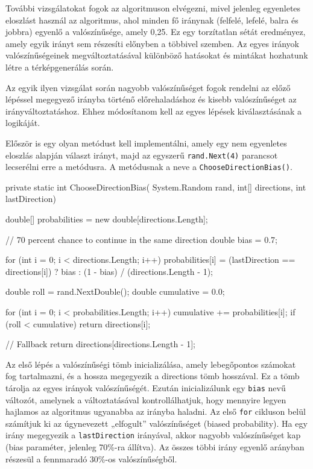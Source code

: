 \newpage
További vizsgálatokat fogok az algoritmuson elvégezni, mivel jelenleg egyenletes eloszlást használ az algoritmus, ahol minden fő iránynak (felfelé, lefelé, balra és jobbra) egyenlő a valószínűsége, amely 0,25. Ez egy torzítatlan sétát eredményez, amely egyik irányt sem részesíti előnyben a többivel szemben. Az egyes irányok valószínűségeinek megváltoztatásával különböző hatásokat és mintákat hozhatunk létre a térképgenerálás során.

Az egyik ilyen vizsgálat során nagyobb valószínűséget fogok rendelni az előző lépéssel megegyező irányba történő előrehaladáshoz és kisebb valószínűséget az irányváltoztatáshoz. Ehhez módosítanom kell az egyes lépések kiválasztásának a logikáját.

Először is egy olyan metódust kell implementálni, amely egy nem egyenletes eloszlás alapján választ irányt, majd az egyszerű \texttt{rand.Next(4)} parancsot lecserélni erre a metódusra. A metódusnak a neve a \texttt{ChooseDirectionBias()}.

\begin{java}
private static int ChooseDirectionBias(
    System.Random rand, int[] directions, int lastDirection)
{
    double[] probabilities = 
        new double[directions.Length];

    // 70 percent chance to continue in the same direction
    double bias = 0.7; 

    for (int i = 0; i < directions.Length; i++)
    {
        probabilities[i] = 
            (lastDirection == directions[i]) ? 
            bias : (1 - bias) / (directions.Length - 1);
    }

    double roll = rand.NextDouble();
    double cumulative = 0.0;

    for (int i = 0; i < probabilities.Length; i++)
    {
        cumulative += probabilities[i];
        if (roll < cumulative)
        {
            return directions[i];
        }
    }

    // Fallback
    return directions[directions.Length - 1]; 
}
\end{java}

Az első lépés a valószínűségi tömb inicializálása, amely lebegőpontos számokat fog tartalmazni, és a hossza megegyezik a directions tömb hosszával. Ez a tömb tárolja az egyes irányok valószínűségét. Ezután inicializálunk egy \texttt{bias} nevű változót, amelynek a változtatásával kontrollálhatjuk, hogy mennyire legyen hajlamos az algoritmus ugyanabba az irányba haladni. Az első \texttt{for} cikluson belül számítjuk ki az úgynevezett „elfogult” valószínűséget (biased probability). Ha egy irány megegyezik a \texttt{lastDirection} irányával, akkor nagyobb valószínűséget kap (bias paraméter, jelenleg 70\%-ra állítva). Az összes többi irány egyenlő arányban részesül a fennmaradó 30\%-os valószínűségből.

